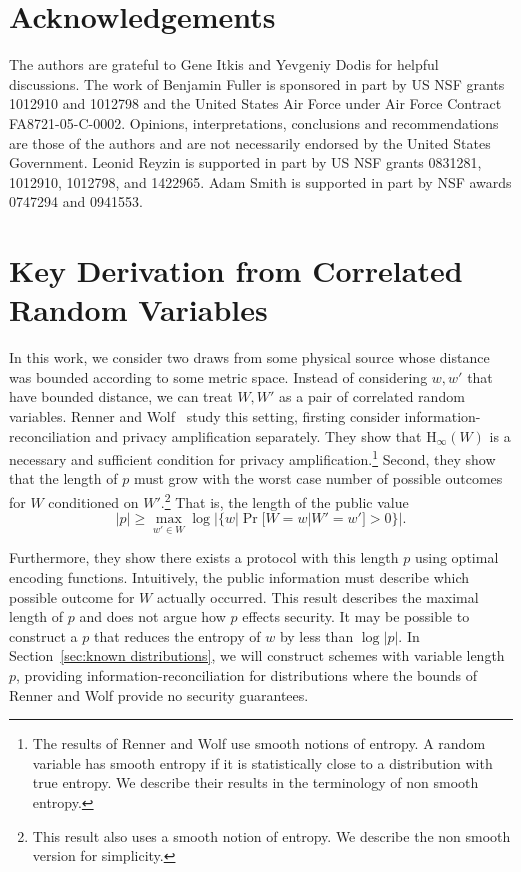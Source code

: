 \documentclass[11pt]{article}
\newcommand{\secref}[1]{\mbox{Section~\ref{#1}}}
\newcommand{\Hoo}{\mathrm{H}_\infty}
\begin{document}
\section*{Acknowledgements}
The authors are grateful to Gene Itkis and Yevgeniy Dodis for helpful discussions.
The work of Benjamin Fuller is sponsored in part by US NSF grants 1012910 and 1012798 and  the United States Air Force under Air Force Contract FA8721-05-C-0002. Opinions, interpretations, conclusions and recommendations are those of the authors and are not necessarily endorsed by the United States Government. 
Leonid Reyzin is supported in part by US NSF grants 0831281, 1012910, 1012798, and 1422965.  Adam Smith is supported in part by NSF awards 0747294 and 0941553.





\appendix

\section{Key Derivation from Correlated Random Variables}
\label{sec:corr variables}

In this work, we consider two draws from some physical source whose distance was bounded according to some metric space.
Instead of considering $w, w'$ that have bounded distance, we can treat $W, W'$ as a pair of correlated random variables.  
  Renner and Wolf~\cite{DBLP:conf/asiacrypt/RennerW05} study this setting, firsting consider information-reconciliation and privacy amplification separately.  They show that $\Hoo(W)$ is a necessary and sufficient condition for privacy amplification.\footnote{The results of Renner and Wolf use smooth notions of entropy.  A random variable has smooth entropy if it is statistically close to a distribution with true entropy. We describe their results in the terminology of non smooth entropy.}  Second, they show that the length of $p$ must grow with the worst case number of possible outcomes for $W$ conditioned on $W'$.\footnote{This result also uses a smooth notion of entropy.  We describe the non smooth version for simplicity.}  That is, the length of the public value \[|p|\ge \max_{w'\in W} \log |\{w | \Pr[W=w | W'=w']>0\}|.\]

Furthermore, they show there exists a protocol with this length $p$ using optimal encoding functions.  Intuitively, the public information must describe which possible outcome for $W$ actually occurred. This result describes the maximal length of $p$ and does not argue how $p$ effects security.  It may be possible to construct a $p$ that reduces the entropy of $w$ by less than $\log |p|$.  In \secref{sec:known distributions}, we will construct schemes with variable length $p$, providing information-reconciliation for distributions where the bounds of Renner and Wolf provide no security guarantees.
\end{document}
